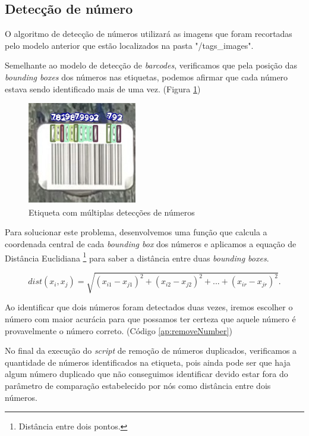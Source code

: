 \subsection{Detecção de número}


O algoritmo de detecção de números utilizará as imagens que foram recortadas pelo modelo anterior que estão localizados na pasta "/tags\_images". 

Semelhante ao modelo de detecção de \textit{barcodes}, verificamos que pela posição das \textit{bounding boxes} dos números nas etiquetas, podemos afirmar que cada número estava sendo identificado mais de uma vez. (Figura \ref{fig:numDup})

\begin{figure}[H]
	\centering
	\includegraphics[width=0.4\linewidth]{figuras/MachineLearning/numDup.png}
	\caption{Etiqueta com múltiplas detecções de números}
	\label{fig:numDup}
\end{figure}

Para solucionar este problema, desenvolvemos uma função que calcula a coordenada central de cada \textit{bounding box} dos números e aplicamos a equação de Distância Euclidiana \footnote{Distância entre dois pontos.} para saber a distância entre duas \textit{bounding boxes}. 

\begin{equation} 
dist(x_{i}, x_{j}) = \sqrt{(x_{i1} - x_{j1})^2 + (x_{i2} - x_{j2})^2 +...+ (x_{ir} - x_{jr})^2}.
\label{eq: euclid}
\end{equation}

Ao identificar que dois números foram detectados duas vezes, iremos escolher o número com maior acurácia para que possamos ter certeza que aquele número é provavelmente o número correto. (Código \ref{ap:removeNumber})

No final da execução do \textit{script} de remoção de números duplicados, verificamos a quantidade de números identificados na etiqueta, pois ainda pode ser que haja algum número duplicado que não conseguimos identificar devido estar fora do parâmetro de comparação estabelecido por nós como distância entre dois números. 


